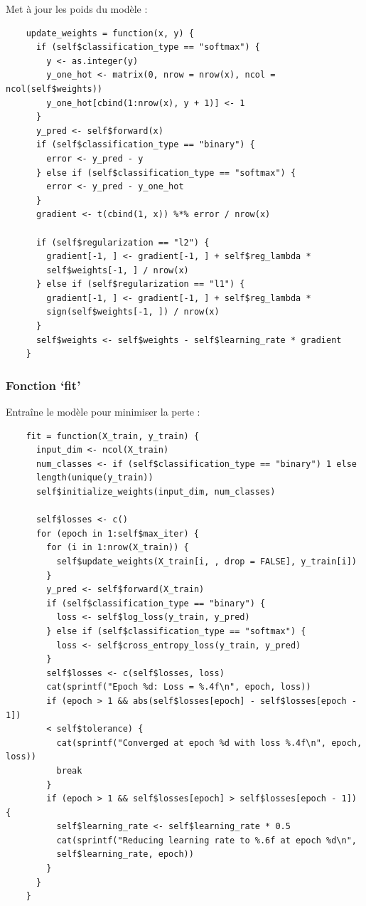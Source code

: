 \documentclass[10pt,french]{report}
\begin{document}
    Met à jour les poids du modèle :
    \begin{verbatim}
    update_weights = function(x, y) {
      if (self$classification_type == "softmax") {
        y <- as.integer(y)
        y_one_hot <- matrix(0, nrow = nrow(x), ncol = ncol(self$weights))
        y_one_hot[cbind(1:nrow(x), y + 1)] <- 1
      }
      y_pred <- self$forward(x)
      if (self$classification_type == "binary") {
        error <- y_pred - y
      } else if (self$classification_type == "softmax") {
        error <- y_pred - y_one_hot
      }
      gradient <- t(cbind(1, x)) %*% error / nrow(x)

      if (self$regularization == "l2") {
        gradient[-1, ] <- gradient[-1, ] + self$reg_lambda * 
        self$weights[-1, ] / nrow(x)
      } else if (self$regularization == "l1") {
        gradient[-1, ] <- gradient[-1, ] + self$reg_lambda * 
        sign(self$weights[-1, ]) / nrow(x)
      }
      self$weights <- self$weights - self$learning_rate * gradient
    }
    \end{verbatim}

    \subsubsection{Fonction \enquote*{fit}}

    Entraîne le modèle pour minimiser la perte :
    \begin{verbatim}
    fit = function(X_train, y_train) {
      input_dim <- ncol(X_train)
      num_classes <- if (self$classification_type == "binary") 1 else 
      length(unique(y_train))
      self$initialize_weights(input_dim, num_classes)

      self$losses <- c()
      for (epoch in 1:self$max_iter) {
        for (i in 1:nrow(X_train)) {
          self$update_weights(X_train[i, , drop = FALSE], y_train[i])
        }
        y_pred <- self$forward(X_train)
        if (self$classification_type == "binary") {
          loss <- self$log_loss(y_train, y_pred)
        } else if (self$classification_type == "softmax") {
          loss <- self$cross_entropy_loss(y_train, y_pred)
        }
        self$losses <- c(self$losses, loss)
        cat(sprintf("Epoch %d: Loss = %.4f\n", epoch, loss))
        if (epoch > 1 && abs(self$losses[epoch] - self$losses[epoch - 1]) 
        < self$tolerance) {
          cat(sprintf("Converged at epoch %d with loss %.4f\n", epoch, loss))
          break
        }
        if (epoch > 1 && self$losses[epoch] > self$losses[epoch - 1]) {
          self$learning_rate <- self$learning_rate * 0.5
          cat(sprintf("Reducing learning rate to %.6f at epoch %d\n", 
          self$learning_rate, epoch))
        }
      }
    }
    \end{verbatim}
\end{document}
